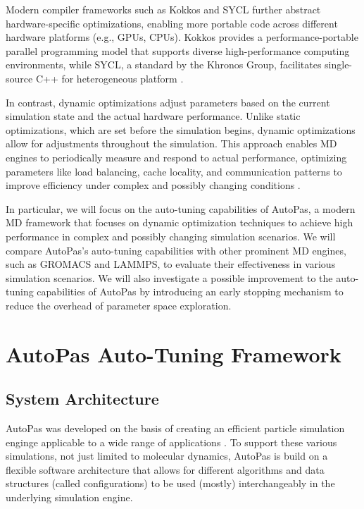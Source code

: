 \documentclass[conference]{IEEEtran}
\begin{document}
Modern compiler frameworks such as Kokkos and SYCL further abstract hardware-specific optimizations, enabling more portable code across different hardware platforms (e.g., GPUs, CPUs). Kokkos provides a performance-portable parallel programming model that supports diverse high-performance computing environments, while SYCL, a standard by the Khronos Group, facilitates single-source C++ for heterogeneous platform .

In contrast, dynamic optimizations adjust parameters based on the current simulation state and the actual hardware performance. Unlike static optimizations, which are set before the simulation begins, dynamic optimizations allow for adjustments throughout the simulation. This approach enables MD engines to periodically measure and respond to actual performance, optimizing parameters like load balancing, cache locality, and communication patterns to improve efficiency under complex and possibly changing conditions .


In particular, we will focus on the auto-tuning capabilities of AutoPas, a modern MD framework that focuses on dynamic optimization techniques to achieve high performance in complex and possibly changing simulation scenarios. We will compare AutoPas's auto-tuning capabilities with other prominent MD engines, such as GROMACS and LAMMPS, to evaluate their effectiveness in various simulation scenarios. We will also investigate a possible improvement to the auto-tuning capabilities of AutoPas by introducing an early stopping mechanism to reduce the overhead of parameter space exploration.


\section{AutoPas Auto-Tuning Framework}
\subsection{System Architecture}

AutoPas was developed on the basis of creating an efficient particle simulation enginge applicable to a wide range of applications \cite{Tchipev2020}. To support these various simulations, not just limited to molecular dynamics, AutoPas is build on a flexible software architecture that allows for different algorithms and data structures (called configurations) to be used (mostly) interchangeably in the underlying simulation engine.
\end{document}
